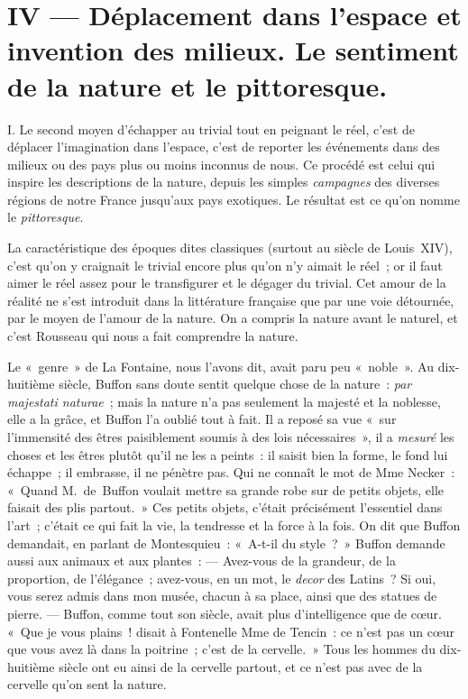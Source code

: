 \documentclass[french,twoside]{book} %
\begin{document}
\section[{IV — Déplacement dans l’espace et invention des milieux. Le sentiment de la nature et le pittoresque.}]{IV — Déplacement dans l’espace et invention des milieux. Le sentiment de la nature et le pittoresque.}
\noindent I. Le second moyen d’échapper au trivial tout en peignant le réel, c’est de déplacer l’imagination dans l’espace, c’est de reporter les événements dans des milieux ou des pays plus ou moins inconnus de nous. Ce procédé est celui qui inspire les descriptions de la nature, depuis les simples \emph{campagnes} des diverses régions de notre France jusqu’aux pays exotiques. Le résultat est ce qu’on nomme le \emph{pittoresque}.\par
La caractéristique des époques dites classiques (surtout au siècle de Louis XIV), c’est qu’on y craignait le trivial encore plus qu’on n’y aimait le réel ; or il faut aimer le réel assez pour le transfigurer et le dégager du trivial. Cet amour de la réalité ne s’est introduit dans la littérature française que par une voie détournée, par le moyen de l’amour de la nature. On a compris la nature avant le naturel, et c’est Rousseau qui nous a fait comprendre la nature.\par
Le « genre » de La Fontaine, nous l’avons dit, avait paru peu « noble ». Au dix-huitième siècle, Buffon sans doute sentit quelque chose de la nature : \emph{par majestati naturae} ; mais la nature n’a pas seulement la majesté et la noblesse, elle a la grâce, et Buffon l’a oublié tout à fait. Il a reposé sa vue « sur l’immensité des êtres paisiblement soumis à des lois nécessaires », il a \emph{mesuré} les choses et les êtres plutôt qu’il ne les a peints : il saisit bien la forme, le fond lui échappe ; il embrasse, il ne pénètre pas. Qui ne connaît le mot de Mme Necker : « Quand M. de Buffon voulait mettre sa grande robe sur de petits objets, elle faisait des plis partout. » Ces petits objets, c’était précisément l’essentiel dans l’art ; c’était ce qui fait la vie, la tendresse et la force à la fois. On dit que Buffon demandait, en parlant de Montesquieu : « A-t-il du style ? » Buffon demande aussi aux animaux et aux plantes : — Avez-vous de la grandeur, de la proportion, de l’élégance ; avez-vous, en un mot, le \emph{decor} des Latins ? Si oui, vous serez admis dans mon musée, chacun à sa place, ainsi que des statues de pierre. — Buffon, comme tout son siècle, avait plus d’intelligence que de cœur. « Que je vous plains ! disait à Fontenelle Mme de Tencin : ce n’est pas un cœur que vous avez là dans la poitrine ; c’est de la cervelle. » Tous les hommes du dix-huitième siècle ont eu ainsi de la cervelle partout, et ce n’est pas avec de la cervelle qu’on sent la nature.\par
\end{document}
